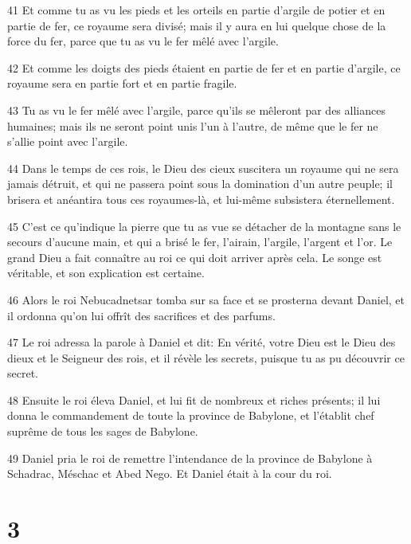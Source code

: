 \par 41 Et comme tu as vu les pieds et les orteils en partie d'argile de potier et en partie de fer, ce royaume sera divisé; mais il y aura en lui quelque chose de la force du fer, parce que tu as vu le fer mêlé avec l'argile.
\par 42 Et comme les doigts des pieds étaient en partie de fer et en partie d'argile, ce royaume sera en partie fort et en partie fragile.
\par 43 Tu as vu le fer mêlé avec l'argile, parce qu'ils se mêleront par des alliances humaines; mais ils ne seront point unis l'un à l'autre, de même que le fer ne s'allie point avec l'argile.
\par 44 Dans le temps de ces rois, le Dieu des cieux suscitera un royaume qui ne sera jamais détruit, et qui ne passera point sous la domination d'un autre peuple; il brisera et anéantira tous ces royaumes-là, et lui-même subsistera éternellement.
\par 45 C'est ce qu'indique la pierre que tu as vue se détacher de la montagne sans le secours d'aucune main, et qui a brisé le fer, l'airain, l'argile, l'argent et l'or. Le grand Dieu a fait connaître au roi ce qui doit arriver après cela. Le songe est véritable, et son explication est certaine.
\par 46 Alors le roi Nebucadnetsar tomba sur sa face et se prosterna devant Daniel, et il ordonna qu'on lui offrît des sacrifices et des parfums.
\par 47 Le roi adressa la parole à Daniel et dit: En vérité, votre Dieu est le Dieu des dieux et le Seigneur des rois, et il révèle les secrets, puisque tu as pu découvrir ce secret.
\par 48 Ensuite le roi éleva Daniel, et lui fit de nombreux et riches présents; il lui donna le commandement de toute la province de Babylone, et l'établit chef suprême de tous les sages de Babylone.
\par 49 Daniel pria le roi de remettre l'intendance de la province de Babylone à Schadrac, Méschac et Abed Nego. Et Daniel était à la cour du roi.

\chapter{3}

